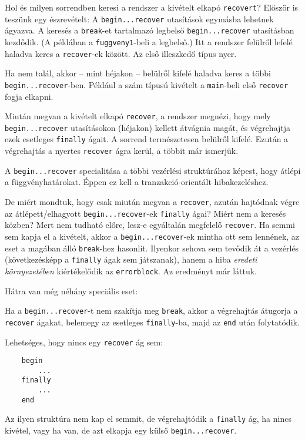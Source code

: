 Hol és milyen sorrendben keresi a rendszer a kivételt elkapó
\verb!recovert!? Először is teszünk egy észrevételt: 
A \verb!begin...recover! utasítások egymásba lehetnek ágyazva. 
A keresés a \verb!break!-et tartalmazó legbelső \verb!begin...recover! 
utasításban kezdődik. (A példában a \verb!fuggveny1!-beli a legbelső.)
Itt a rendszer felülről lefelé haladva keres a \verb!recover!-ek között.
Az első illeszkedő típus nyer.

Ha nem talál, akkor -- mint héjakon -- belülről kifelé haladva keres a
többi \verb!begin...recover!-ben. Például a szám típusú kivételt 
a \verb!main!-beli első \verb!recover! fogja elkapni.

Miután megvan a kivételt elkapó \verb!recover!,
a rendszer megnézi, hogy mely \verb!begin...recover! utasításokon (héjakon)
kellett átvágnia magát, és végrehajtja ezek esetleges \verb!finally! ágait. 
A sorrend természetesen belülről kifelé. Ezután a végrehajtás a nyertes 
\verb!recover! ágra kerül, a többit már ismerjük.

A \verb!begin...recover! specialitása a többi vezérlési struktúrához képest,
hogy átlépi a függvényhatárokat. Éppen ez kell a tranzakció-orientált hibakezeléshez.

De miért mondtuk, hogy csak miután megvan a \verb!recover!, azután hajtódnak 
végre az átlépett/elhagyott \verb!begin...recover!-ek \verb!finally! ágai?
Miért nem a keresés közben? Mert nem tudható előre, lesz-e egyáltalán megfelelő
\verb!recover!. Ha semmi sem kapja el a kivételt, akkor a \verb!begin...recover!-ek
mintha ott sem lennének, az eset a magában álló \verb!break!-hez hasonlít.
Ilyenkor sehova sem tevődik át a vezérlés (következésképp a \verb!finally! ágak
sem játszanak), hanem a hiba {\em eredeti környezetében\/} kiértékelődik
az \verb!errorblock!. Az eredményt már láttuk.

Hátra van még néhány speciális eset:

Ha a \verb!begin...recover!-t nem szakítja meg \verb!break!,
akkor a végrehajtás átugorja a \verb!recover! ágakat,
belemegy az esetleges \verb!finally!-ba,
majd az \verb!end! után folytatódik.

Lehetséges, hogy nincs egy \verb!recover! ág sem:
\begin{verbatim}
    begin
        ...
    finally
        ...
    end
\end{verbatim}
Az ilyen struktúra nem kap el semmit,
de végrehajtódik a \verb!finally! ág, ha nincs kivétel, 
vagy ha van, de azt elkapja egy külső \verb!begin...recover!.

